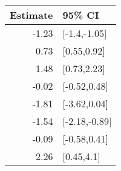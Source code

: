 \begin{tabular}{rl}
  \hline
Estimate & 95\% CI \\ 
  \hline
-1.23 & [-1.4,-1.05] \\ 
  0.73 & [0.55,0.92] \\ 
  1.48 & [0.73,2.23] \\ 
  -0.02 & [-0.52,0.48] \\ 
  -1.81 & [-3.62,0.04] \\ 
  -1.54 & [-2.18,-0.89] \\ 
  -0.09 & [-0.58,0.41] \\ 
  2.26 & [0.45,4.1] \\ 
   \hline
\end{tabular}

